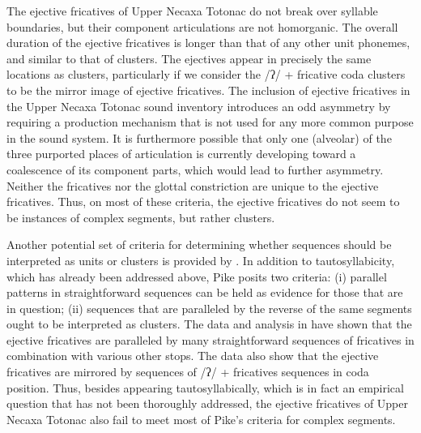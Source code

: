 \documentclass[output=paper,colorlinks,citecolor=brown]{langscibook}
\begin{document}
The ejective fricatives of Upper Necaxa Totonac do not break over syllable boundaries, but their component articulations are not homorganic. The overall duration of the ejective fricatives is longer than that of any other unit phonemes, and similar to that of clusters. The ejectives appear in precisely the same locations as clusters, particularly if we consider the /ʔ/ + fricative coda clusters to be the mirror image of ejective fricatives. The inclusion of ejective fricatives in the Upper Necaxa Totonac sound inventory introduces an odd asymmetry by requiring a production mechanism that is not used for any more common purpose in the sound system. It is furthermore possible that only one (alveolar) of the three purported places of articulation is currently developing toward a coalescence of its component parts, which would lead to further asymmetry. Neither the fricatives nor the glottal constriction are unique to the ejective fricatives. Thus, on most of these criteria, the ejective fricatives do not seem to be instances of complex segments, but rather clusters.

Another potential set of criteria for determining whether sequences should be interpreted as units or clusters is provided by \citet{Pike1947}. In addition to tautosyllabicity, which has already been addressed above, Pike posits two criteria: (i) parallel patterns in straightforward sequences can be held as evidence for those that are in question; (ii) sequences that are paralleled by the reverse of the same segments ought to be interpreted as clusters. The data and analysis in  have shown that the ejective fricatives are paralleled by many straightforward sequences of fricatives in combination with various other stops. The data also show that the ejective fricatives are mirrored by sequences of /ʔ/ + fricatives sequences in coda position. Thus, besides appearing tautosyllabically, which is in fact an empirical question that has not been thoroughly addressed, the ejective fricatives of Upper Necaxa Totonac also fail to meet most of Pike's criteria for complex segments.
\end{document}
